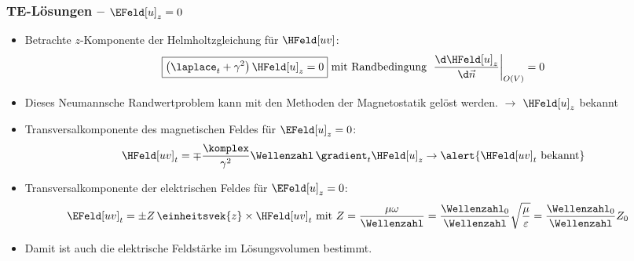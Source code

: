 \begin{frame}
  \frametitle{TE-Lösungen -- \(\EFeld[u]_z = 0\)}
  \begin{itemize}[<+->]
  \item Betrachte \(z\)-Komponente der Helmholtzgleichung für \(\HFeld[uv]\):
    \begin{equation*}
      \boxed{\left(\laplace_t + \gamma^2\right) \HFeld[u]_z =  0} \text{ mit Randbedingung } \left. \frac{\d \HFeld[u]_z}{\d \vec{n}}\right|_{O(V)} = 0 
    \end{equation*}
  \item Dieses \alert{Neumannsche Randwertproblem} kann mit den Methoden der Magnetostatik gelöst werden. \(\to\) \alert{\(\HFeld[u]_z\) bekannt}
  \item Transversalkomponente des magnetischen Feldes für \(\EFeld[u]_z = 0\):
    \begin{equation*}
      \HFeld[uv]_t = \mp \frac{\komplex}{\gamma^2} \Wellenzahl\, \gradient_t \HFeld[u]_{z}  \to \alert{\HFeld[uv]_t \text{ bekannt}}
    \end{equation*}
  \item Transversalkomponente der elektrischen Feldes für \(\EFeld[u]_z = 0\):
       \begin{align*}
         \EFeld[uv]_t &= \pm Z\, \einheitsvek{z}\times \HFeld[uv]_{t} \text{ mit } Z=\frac{\mu\omega}{\Wellenzahl} = \frac{\Wellenzahl_0}{\Wellenzahl}\sqrt{\frac{\mu}{\varepsilon}} = \frac{\Wellenzahl_0}{\Wellenzahl} Z_0 
       \end{align*}
       \item Damit ist auch die \alert{elektrische Feldstärke im Lösungsvolumen bestimmt}. 
       \end{itemize}
       \ 
\end{frame}


